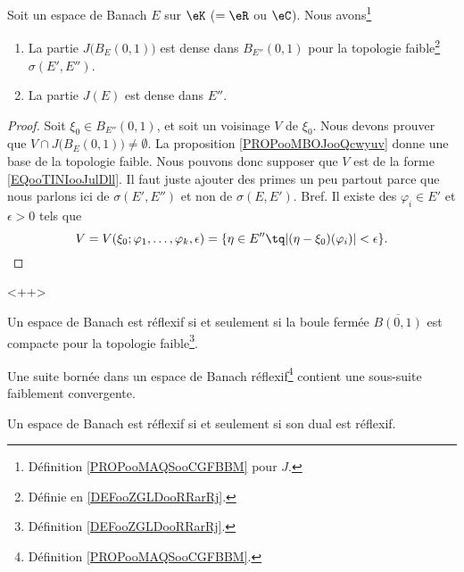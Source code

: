 \begin{theorem}	\label{THOooATSGooSZZYPz}
	Soit un espace de Banach \( E\) sur \( \eK\) (\( =\eR\) ou \( \eC\)). Nous avons\footnote{Définition \ref{PROPooMAQSooCGFBBM} pour \( J\).}
	\begin{enumerate}
		\item
		      La partie \( J\big( B_E(0,1) \big)\) est dense dans \( B_{E''}(0,1)\) pour la topologie faible\footnote{Définie en \ref{DEFooZGLDooRRarRj}.} \( \sigma(E',E'')\).
		\item
		      La partie \( J(E)\) est dense dans \( E''\).
	\end{enumerate}
\end{theorem}

\begin{proof}
	Soit \( \xi_0\in B_{E''}(0,1)\), et soit un voisinage \( V\) de \( \xi_0\). Nous devons prouver que \( V\cap J\big( B_E(0,1) \big)\neq \emptyset\). La proposition \ref{PROPooMBOJooQcwyuv} donne une base de la topologie faible. Nous pouvons donc supposer que \( V\) est de la forme \eqref{EQooTINIooJulDll}. Il faut juste ajouter des primes un peu partout parce que nous parlons ici de \( \sigma(E',E'') \) et non de \( \sigma(E,E')\). Bref. Il existe des \( \varphi_i\in E'\) et \( \epsilon>0\) tels que
	\begin{equation}
		V=V(\xi_0;\varphi_1,\ldots,\varphi_k,\epsilon)=\{ \eta\in E''\tq | (\eta-\xi_0)(\varphi_i) |<\epsilon \}.
	\end{equation}
\end{proof}<++>

\begin{theorem}       \label{THOooTFIHooPQjVAr}
	Un espace de Banach est réflexif si et seulement si la boule fermée \( \overline{ B(0,1) }\) est compacte pour la topologie faible\footnote{Définition \ref{DEFooZGLDooRRarRj}.}.
\end{theorem}

\begin{proposition}       \label{PROPooPVVYooMZjQSq}
	Une suite bornée dans un espace de Banach réflexif\footnote{Définition \ref{PROPooMAQSooCGFBBM}.} contient une sous-suite faiblement convergente.
\end{proposition}

\begin{proposition}       \label{PROPooBBNBooGcXDRH}
	Un espace de Banach est réflexif si et seulement si son dual est réflexif.
\end{proposition}

